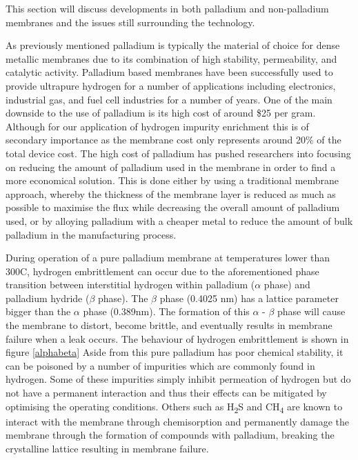 This section will discuss developments in both palladium and non-palladium membranes and the issues still surrounding the technology.

As previously mentioned palladium is typically the material of choice for dense metallic 
membranes due to its combination of high stability, permeability, and catalytic activity. 
Palladium based membranes have been successfully used to provide ultrapure hydrogen for a 
number of applications including electronics, industrial gas, and fuel cell industries for a 
number of years. One of the main downside to the use of palladium is its high cost of around \$25 
per gram. \cite{JohnsomMattheyPreciousMetalsManagement2016} Although for our application of hydrogen impurity enrichment this is of secondary importance as the membrane cost only represents around 20\% of the total device cost. The high cost of palladium has pushed researchers into focusing on reducing the amount of 
palladium used in the membrane in order to find a more economical solution. This is done 
either by using a traditional membrane approach, whereby the thickness of the membrane layer 
is reduced as much as possible to maximise the flux while decreasing the overall amount of 
palladium used, or by alloying palladium with a cheaper metal to reduce the amount of bulk 
palladium in the manufacturing process. 

During operation of a pure palladium membrane at temperatures lower than 300\textdegree C, 
hydrogen embrittlement can occur due to the aforementioned phase transition between 
interstitial hydrogen within palladium ($\alpha$ phase) and palladium hydride ($\beta$ phase). 
The $\beta$ phase (0.4025 nm) has a lattice parameter bigger than the $\alpha$ phase 
(0.389nm). \cite{Flanagan1991}  The formation of this $\alpha$ - $\beta$ phase will cause the membrane to distort, 
become brittle, and eventually results in membrane failure when a leak occurs. \cite{Li2008b} The behaviour of hydrogen embrittlement is shown in figure \ref{alphabeta}
Aside from this pure palladium has poor chemical stability, it can be poisoned by a 
number of impurities which are commonly found in hydrogen. Some of these impurities 
simply inhibit permeation of hydrogen but do not have a permanent interaction and thus 
their effects can be mitigated by optimising the operating conditions. Others such as 
H\textsubscript{2}S and CH\textsubscript{4} are known to interact with the membrane through chemisorption and permanently 
damage the membrane through the formation of compounds with palladium, breaking the 
crystalline lattice resulting in membrane failure.  

